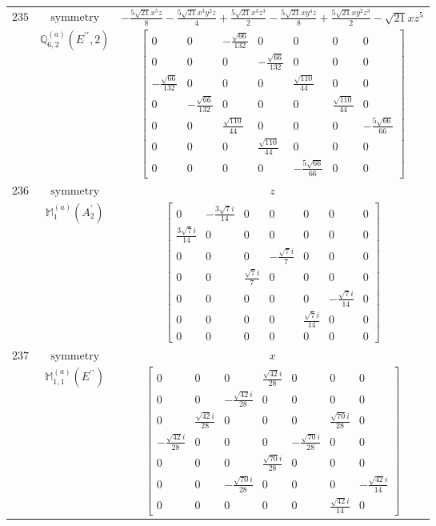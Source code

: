 \documentclass[fleqn,8pt,landscape]{jsarticle}
\begin{document}
\begin{longtable}{ccc}
$ 235 $ & $ \text{symmetry} $ & $ - \frac{5 \sqrt{21} x^{5} z}{8} - \frac{5 \sqrt{21} x^{3} y^{2} z}{4} + \frac{5 \sqrt{21} x^{3} z^{3}}{2} - \frac{5 \sqrt{21} x y^{4} z}{8} + \frac{5 \sqrt{21} x y^{2} z^{3}}{2} - \sqrt{21} x z^{5} $ \\
$  $ & $ \mathbb{Q}_{6,2}^{(a)}(E^{\prime\prime},2) $ & $ \begin{bmatrix} 0 & 0 & - \frac{\sqrt{66}}{132} & 0 & 0 & 0 & 0 \\ 0 & 0 & 0 & - \frac{\sqrt{66}}{132} & 0 & 0 & 0 \\ - \frac{\sqrt{66}}{132} & 0 & 0 & 0 & \frac{\sqrt{110}}{44} & 0 & 0 \\ 0 & - \frac{\sqrt{66}}{132} & 0 & 0 & 0 & \frac{\sqrt{110}}{44} & 0 \\ 0 & 0 & \frac{\sqrt{110}}{44} & 0 & 0 & 0 & - \frac{5 \sqrt{66}}{66} \\ 0 & 0 & 0 & \frac{\sqrt{110}}{44} & 0 & 0 & 0 \\ 0 & 0 & 0 & 0 & - \frac{5 \sqrt{66}}{66} & 0 & 0 \end{bmatrix} $ \\ \hline
$ 236 $ & $ \text{symmetry} $ & $ z $ \\
$  $ & $ \mathbb{M}_{1}^{(a)}(A_{2}^{\prime}) $ & $ \begin{bmatrix} 0 & - \frac{3 \sqrt{7} i}{14} & 0 & 0 & 0 & 0 & 0 \\ \frac{3 \sqrt{7} i}{14} & 0 & 0 & 0 & 0 & 0 & 0 \\ 0 & 0 & 0 & - \frac{\sqrt{7} i}{7} & 0 & 0 & 0 \\ 0 & 0 & \frac{\sqrt{7} i}{7} & 0 & 0 & 0 & 0 \\ 0 & 0 & 0 & 0 & 0 & - \frac{\sqrt{7} i}{14} & 0 \\ 0 & 0 & 0 & 0 & \frac{\sqrt{7} i}{14} & 0 & 0 \\ 0 & 0 & 0 & 0 & 0 & 0 & 0 \end{bmatrix} $ \\ \hline
$ 237 $ & $ \text{symmetry} $ & $ x $ \\
$  $ & $ \mathbb{M}_{1,1}^{(a)}(E^{\prime\prime}) $ & $ \begin{bmatrix} 0 & 0 & 0 & \frac{\sqrt{42} i}{28} & 0 & 0 & 0 \\ 0 & 0 & - \frac{\sqrt{42} i}{28} & 0 & 0 & 0 & 0 \\ 0 & \frac{\sqrt{42} i}{28} & 0 & 0 & 0 & \frac{\sqrt{70} i}{28} & 0 \\ - \frac{\sqrt{42} i}{28} & 0 & 0 & 0 & - \frac{\sqrt{70} i}{28} & 0 & 0 \\ 0 & 0 & 0 & \frac{\sqrt{70} i}{28} & 0 & 0 & 0 \\ 0 & 0 & - \frac{\sqrt{70} i}{28} & 0 & 0 & 0 & - \frac{\sqrt{42} i}{14} \\ 0 & 0 & 0 & 0 & 0 & \frac{\sqrt{42} i}{14} & 0 \end{bmatrix} $ \\ \hline

\end{longtable}
\end{document}
